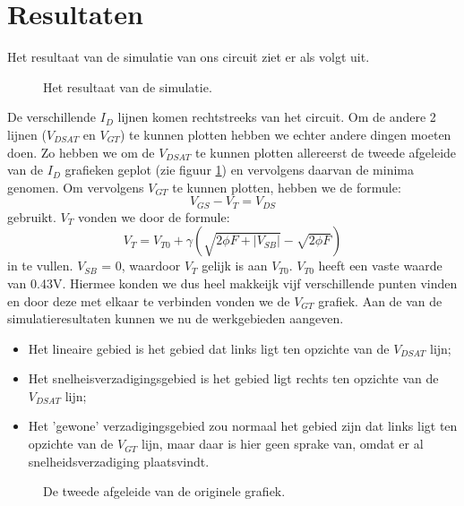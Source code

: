 \documentclass{scrartcl}  %
\begin{document}
\section{Resultaten}
Het resultaat van de simulatie van ons circuit ziet er als volgt uit.
\begin{figure}[H]
\centering
		\setlength{} 
		\setlength{}
		
		\caption{Het resultaat van de simulatie.}
		\label{fig:Id}
\end{figure}
De verschillende $I_{D}$ lijnen komen rechtstreeks van het circuit. Om de andere 2 lijnen ($V_{DSAT}$ en $V_{GT}$) te kunnen plotten hebben we echter andere dingen moeten doen. Zo hebben we om de $V_{DSAT}$ te kunnen plotten allereerst de tweede afgeleide van de $I_{D}$ grafieken geplot (zie figuur \ref{fig:Id}) en vervolgens daarvan de minima genomen. 
Om vervolgens $V_{GT}$ te kunnen plotten, hebben we de formule: 
\begin{equation}
V_{GS} - V_{T} = V_{DS} 
\end{equation} gebruikt.
\newline $V_{T}$ vonden we door de formule: 
\begin{equation}
V_{T} = V_{T0} + \gamma (\sqrt {2 \phi F + |V_{SB}|} - \sqrt{ 2 \phi F} ) 
\end{equation} in te vullen. $V_{SB}$ = 0, waardoor $V_{T}$  gelijk is aan $V_{T0}$. $V_{T0}$ heeft een vaste waarde van 0.43V. Hiermee konden we dus heel makkeijk vijf verschillende punten vinden en door deze met elkaar te verbinden vonden we de $V_{GT}$ grafiek. 
\newline Aan de van de simulatieresultaten kunnen we nu de werkgebieden aangeven.
\begin{itemize}
	\item Het lineaire gebied is het gebied dat links ligt ten opzichte van de $V_{DSAT}$ lijn;
	\item Het snelheisverzadigingsgebied is het gebied ligt rechts ten opzichte van de $V_{DSAT}$ lijn;
	\item Het 'gewone' verzadigingsgebied zou normaal het gebied zijn dat links ligt ten opzichte van de $V_{GT}$ lijn, maar daar is hier geen sprake van, omdat er al snelheidsverzadiging plaatsvindt.
\end{itemize}

\begin{figure}[H]
\centering
		\setlength{} 
		\setlength{}
		
		\caption{De tweede afgeleide van de originele grafiek.}
		\label{fig:Id-2nd-div}
\end{figure}
\end{document}
